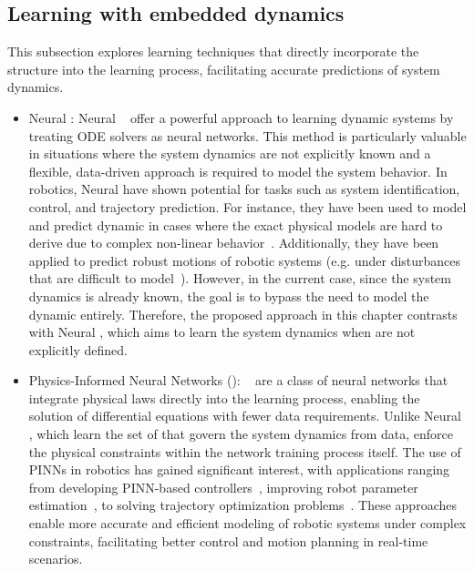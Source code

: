 \subsection{Learning with embedded dynamics}

This subsection explores learning techniques that directly incorporate the  structure into the learning process, facilitating accurate predictions of system dynamics.

\begin{itemize}
    \item Neural : Neural ~\cite{cNeuralodes} offer a powerful approach to learning dynamic systems by treating ODE solvers as neural networks. 
    This method is particularly valuable in situations where the system dynamics are not explicitly known and a flexible, data-driven approach is required to model the system behavior.
    In robotics, Neural  have shown potential for tasks such as system identification, control, and trajectory prediction. 
    For instance, they have been used to model and predict dynamic in cases where the exact physical models are hard to derive due to complex non-linear behavior~\cite{cNeuralodes}. 
    Additionally, they have been applied to predict robust motions of robotic systems (e.g. under disturbances that are difficult to model~\cite{cNODEmotion}).
    However, in the current case, since the system dynamics is already known, the goal is to bypass the need to model the dynamic entirely. 
    Therefore, the proposed approach in this chapter contrasts with Neural , which aims to learn the system dynamics when  are not explicitly defined.
    \item Physics-Informed Neural Networks (): ~\cite{cPinns} are a class of neural networks that integrate physical laws directly into the learning process, enabling the solution of differential equations with fewer data requirements. 
    Unlike Neural , which learn the set of  that govern the system dynamics from data,  enforce the physical constraints within the network training process itself. 
    The use of PINNs in robotics has gained significant interest, with applications ranging from developing PINN-based controllers~\cite{cPinnControl1, cPinnControl2}, improving robot parameter estimation~\cite{cPinnDyna}, to solving trajectory optimization problems~\cite{cPinnMotion}.
    These approaches enable more accurate and efficient modeling of robotic systems under complex constraints, facilitating better control and motion planning in real-time scenarios.

\end{itemize}
